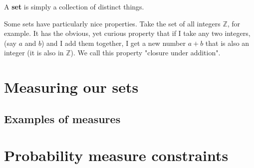 \documentclass{article}
\begin{document}
A \textbf{set} is simply a collection of distinct things. %

Some sets have particularly nice properties. Take the set of all integers $\mathbb{Z}$, for example. It has the obvious, yet curious property that if I take any two integers, (say $a$ and $b$) and I add them together, I get a new number $a + b$ that is also an integer (it is also in $\mathbb{Z}$). We call this property "closure under addition". 





\section{Measuring our sets}





\subsection{Examples of measures}





\section{Probability measure constraints}

\end{document}

